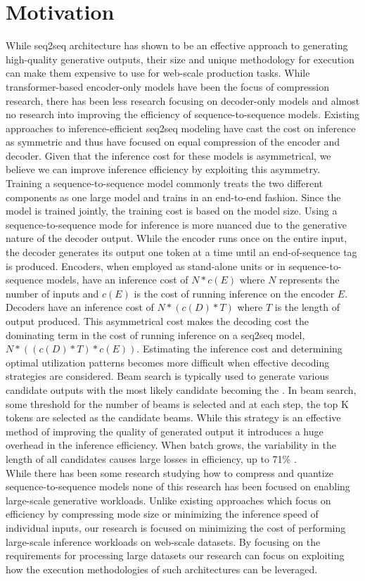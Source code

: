 \section{Motivation}
While seq2seq architecture has shown to be an effective approach to generating high-quality generative outputs, their size and unique methodology for execution can make them expensive to use for web-scale production tasks. While transformer-based encoder-only models have been the focus of compression research, there has been less research focusing on decoder-only models and almost no research into improving the efficiency of sequence-to-sequence models. Existing approaches to inference-efficient seq2seq modeling have cast the cost on inference as symmetric and thus have focused on equal compression of the encoder and decoder. Given that the inference cost for these models is asymmetrical, we believe we can improve inference efficiency by exploiting this asymmetry. \\
Training a sequence-to-sequence model commonly treats the two different components as one large model and trains in an end-to-end fashion. Since the model is trained jointly, the training cost is based on the model size. Using a sequence-to-sequence mode for inference is more nuanced due to the generative nature of the decoder output. While the encoder runs once on the entire input, the decoder generates its output one token at a time until an end-of-sequence tag is produced. Encoders, when employed as stand-alone units or in sequence-to-sequence models, have an inference cost of  $N*c(E)$ where $N$ represents the number of inputs and $c(E)$ is the cost of running inference on the encoder $E$. Decoders have an inference cost of  $N*(c(D)*T)$  where $T$ is the length of output produced. This asymmetrical cost makes the decoding cost the dominating term in the cost of running inference on a seq2seq model, $N*((c(D)*T)* c(E))$. Estimating the inference cost and determining optimal utilization patterns becomes more difficult when effective decoding strategies are considered. Beam search is typically used to generate various candidate outputs with the most likely candidate becoming the . In beam search, some threshold for the number of beams is selected and at each step, the top K tokens are selected as the candidate beams. While this strategy is an effective method of improving the quality of generated output it introduces a huge overhead in the inference efficiency. When batch grows, the variability in the length of all candidates causes large losses in efficiency, up to 71\% \cite{Yang2020ASA}. \\
While there has been some research studying how to compress and quantize sequence-to-sequence models \cite{Li2022DQBARTES} none of this research has been focused on enabling large-scale generative workloads. Unlike existing approaches which focus on efficiency by compressing mode size or minimizing the inference speed of individual inputs, our research is focused on minimizing the cost of performing large-scale inference workloads on web-scale datasets. By focusing on the requirements for processing large datasets our research can focus on exploiting how the execution methodologies of such architectures can be leveraged.  

